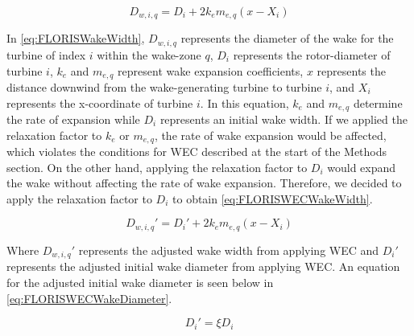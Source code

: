 \documentclass[a4paper]{jpconf}
\begin{document}
\begin{equation}
    D_{w,i,q} = D_i + 2k_em_{e,q}(x - X_i)
    \label{eq:FLORISWakeWidth}
\end{equation}

In \cref{eq:FLORISWakeWidth}, $D_{w,i,q}$ represents the diameter of the wake for the turbine of index $i$ within the wake-zone $q$, $D_i$ represents the rotor-diameter of turbine $i$, $k_e$ and $m_{e,q}$ represent wake expansion coefficients, $x$ represents the distance downwind from the wake-generating turbine to turbine $i$, and $X_i$ represents the x-coordinate of turbine $i$. In this equation, $k_e$ and $m_{e,q}$ determine the rate of expansion while $D_i$ represents an initial wake width. If we applied the relaxation factor to $k_e$ or $m_{e,q}$, the rate of wake expansion would be affected, which violates the conditions for WEC described at the start of the Methods section. On the other hand, applying the relaxation factor to $D_i$ would expand the wake without affecting the rate of wake expansion. Therefore, we decided to apply the relaxation factor to $D_i$ to obtain \cref{eq:FLORISWECWakeWidth}.

\begin{equation}
    D_{w,i,q}' = D_i' + 2k_em_{e,q}(x - X_i)
    \label{eq:FLORISWECWakeWidth}
\end{equation}

Where $D_{w,i,q}'$ represents the adjusted wake width from applying WEC and $D_i'$ represents the adjusted initial wake diameter from applying WEC. An equation for the adjusted initial wake diameter is seen below in \cref{eq:FLORISWECWakeDiameter}.

\begin{equation}
    D_i' = \xi D_i
    \label{eq:FLORISWECWakeDiameter}
\end{equation}

\end{document}
